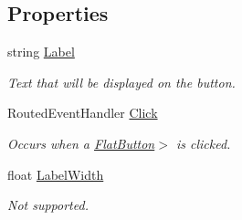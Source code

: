 \subsection*{Properties}
\begin{DoxyCompactItemize}
\item 
string \mbox{\hyperlink{class_wpf_handler_1_1_u_i_1_1_controls_1_1_flat_button_a2408c739aab8767dd0972dd0a7957abc}{Label}}
\begin{DoxyCompactList}\small\item\em Text that will be displayed on the button. \end{DoxyCompactList}\item 
Routed\+Event\+Handler \mbox{\hyperlink{class_wpf_handler_1_1_u_i_1_1_controls_1_1_flat_button_ad9184f68d9f9ae9db49fa4a82a97ae15}{Click}}
\begin{DoxyCompactList}\small\item\em Occurs when a \mbox{\hyperlink{class_wpf_handler_1_1_u_i_1_1_controls_1_1_flat_button}{Flat\+Button}}$>$ is clicked. \end{DoxyCompactList}\item 
float \mbox{\hyperlink{class_wpf_handler_1_1_u_i_1_1_controls_1_1_flat_button_ad8f23ebbd9a85097d01940f80d372217}{Label\+Width}}
\begin{DoxyCompactList}\small\item\em Not supported. \end{DoxyCompactList}\end{DoxyCompactItemize}
